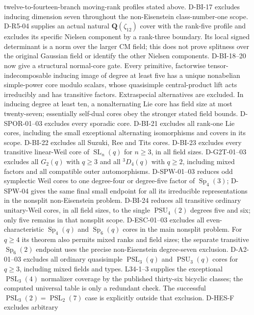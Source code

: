 \documentclass[11pt]{article}
\theoremstyle{remark}\newtheorem{remark}[theorem]{Remark}
\newcommand{\Q}{\mathbf Q}\newcommand{\Z}{\mathbf Z}
\begin{document}
twelve-to-fourteen-branch moving-rank profiles stated above.
D-BI-17 excludes inducing dimension seven throughout the
non-Eisenstein class-number-one scope. D-R5-04 supplies an actual
natural $\Q(\zeta_{12})$ cover with the rank-five profile and
excludes its specific Nielsen component by a rank-three boundary.
Its local signed determinant is a norm over the larger CM field;
this does not prove splitness over the original Gaussian field or
identify the other Nielsen components.
D-BI-18--20 now give a structural normal-core gate. Every primitive,
factorwise tensor-indecomposable inducing image of degree at least five
has a unique nonabelian simple-power core modulo scalars, whose
quasisimple central-product lift acts irreducibly and has transitive
factors. Extraspecial alternatives are excluded. In inducing degree
at least ten, a nonalternating Lie core has field size at most twenty-seven;
essentially self-dual cores obey the stronger stated field bounds.
D-SPOR-01--03 excludes every sporadic core. D-BI-21 excludes all
rank-one Lie cores, including the small exceptional alternating
isomorphisms and covers in its scope. D-BI-22 excludes all Suzuki,
Ree and Tits cores. D-BI-23 excludes every transitive linear-Weil
core of $\operatorname{SL}_n(q)$ for $n\ge3$, in all field sizes.
D-G2T-01--03 excludes all $G_2(q)$ with $q\ge3$ and all
${}^3D_4(q)$ with $q\ge2$, including mixed factors and all compatible
outer automorphisms. D-SPW-01--03 reduces odd symplectic Weil cores
to one degree-four or degree-five factor of $\operatorname{Sp}_4(3)$;
D-SPW-04 gives the same final small endpoint for all its irreducible
representations in the nonsplit non-Eisenstein problem.
D-BI-24 reduces all transitive ordinary unitary-Weil cores, in all
field sizes, to the single $\operatorname{PSU}_4(2)$ degrees five
and six; only five remains in that nonsplit scope.
D-ESC-01--03 excludes all even-characteristic $\operatorname{Sp}_4(q)$
and $\operatorname{Sp}_6(q)$ cores in the main nonsplit problem.
For $q\ge4$ its theorem also permits mixed ranks and field sizes;
the separate transitive $\operatorname{Sp}_6(2)$ endpoint uses the
precise non-Eisenstein degree-seven exclusion. D-A2-01--03 excludes
all ordinary quasisimple $\operatorname{PSL}_3(q)$ and
$\operatorname{PSU}_3(q)$ cores for $q\ge3$, including mixed fields
and types. L34-1--3 supplies the exceptional $\operatorname{PSL}_3(4)$
normalizer coverage by the published thirty-six bicyclic classes;
the computed universal table is only a redundant check.
The successful $\operatorname{PSL}_3(2)=\operatorname{PSL}_2(7)$
case is explicitly outside that exclusion. D-HES-F excludes arbitrary
\end{document}
